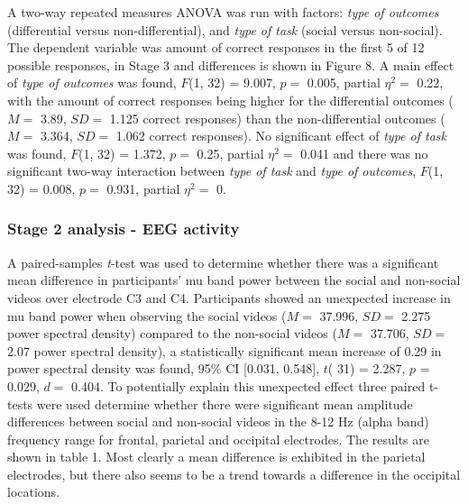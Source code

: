 \documentclass[]{elsarticle} %
\begin{document}
A two-way repeated measures ANOVA was run with factors: \emph{type of
outcomes} (differential versus non-differential), and \emph{type of
task} (social versus non-social). The dependent variable was amount of
correct responses in the first 5 of 12 possible responses, in Stage 3
and differences is shown in Figure 8. A main effect of \emph{type of
outcomes} was found, \(F\)(1, 32) = 9.007, \(p=\) 0.005, partial
\(\eta^2 =\) 0.22, with the amount of correct responses being higher for
the differential outcomes (\(M =\) 3.89, \(SD =\) 1.125 correct
responses) than the non-differential outcomes (\(M =\) 3.364, \(SD =\)
1.062 correct responses). No significant effect of \emph{type of task}
was found, \(F\)(1, 32) = 1.372, \(p =\) 0.25, partial \(\eta^2 =\)
0.041 and there was no significant two-way interaction between
\emph{type of task} and \emph{type of outcomes}, \(F\)(1, 32) = 0.008,
\(p =\) 0.931, partial \(\eta^2 =\) 0.

\hypertarget{stage-2-analysis---eeg-activity}{%
\subsubsection{Stage 2 analysis - EEG
activity}\label{stage-2-analysis---eeg-activity}}

A paired-samples \emph{t}-test was used to determine whether there was a
significant mean difference in participants' mu band power between the
social and non-social videos over electrode C3 and C4. Participants
showed an unexpected increase in mu band power when observing the social
videos (\(M =\) 37.996, \(SD =\) 2.275 power spectral density) compared
to the non-social videos (\(M =\) 37.706, \(SD =\) 2.07 power spectral
density), a statistically significant mean increase of 0.29 in power
spectral density was found, 95\% CI {[}0.031, 0.548{]}, \(t\)( 31) =
2.287, \(p\) = 0.029, \(d =\) 0.404. To potentially explain this
unexpected effect three paired t-tests were used determine whether there
were significant mean amplitude differences between social and
non-social videos in the 8-12 Hz (alpha band) frequency range for
frontal, parietal and occipital electrodes. The results are shown in
table 1. Most clearly a mean difference is exhibited in the parietal
electrodes, but there also seems to be a trend towards a difference in
the occipital locations.
\end{document}
